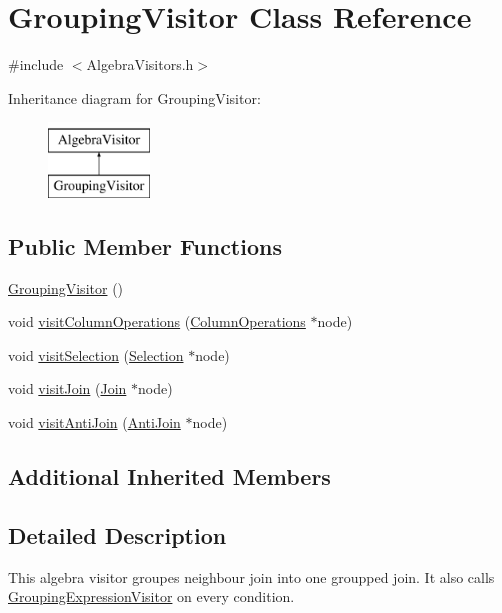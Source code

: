 \hypertarget{class_grouping_visitor}{\section{Grouping\+Visitor Class Reference}
\label{class_grouping_visitor}
}


{\ttfamily \#include $<$Algebra\+Visitors.\+h$>$}

Inheritance diagram for Grouping\+Visitor\+:\begin{figure}[H]
\begin{center}
\leavevmode
\includegraphics[height=2.000000cm]{class_grouping_visitor}
\end{center}
\end{figure}
\subsection*{Public Member Functions}
\begin{DoxyCompactItemize}
\item 
\hyperlink{class_grouping_visitor_adc7a72ec400998ac4dcaacf5c85fb86c}{Grouping\+Visitor} ()
\item 
void \hyperlink{class_grouping_visitor_a2c1557a18e53aaa43665318001df3726}{visit\+Column\+Operations} (\hyperlink{class_column_operations}{Column\+Operations} $\ast$node)
\item 
void \hyperlink{class_grouping_visitor_a4e3563b131b9d26942a6d4693f5c194a}{visit\+Selection} (\hyperlink{class_selection}{Selection} $\ast$node)
\item 
void \hyperlink{class_grouping_visitor_aaa2345624497de18ab3a608e909573aa}{visit\+Join} (\hyperlink{class_join}{Join} $\ast$node)
\item 
void \hyperlink{class_grouping_visitor_a1ddb0cf950feb1df7c2518b543e0d0ad}{visit\+Anti\+Join} (\hyperlink{class_anti_join}{Anti\+Join} $\ast$node)
\end{DoxyCompactItemize}
\subsection*{Additional Inherited Members}


\subsection{Detailed Description}
This algebra visitor groupes neighbour join into one groupped join. It also calls \hyperlink{class_grouping_expression_visitor}{Grouping\+Expression\+Visitor} on every condition. 


